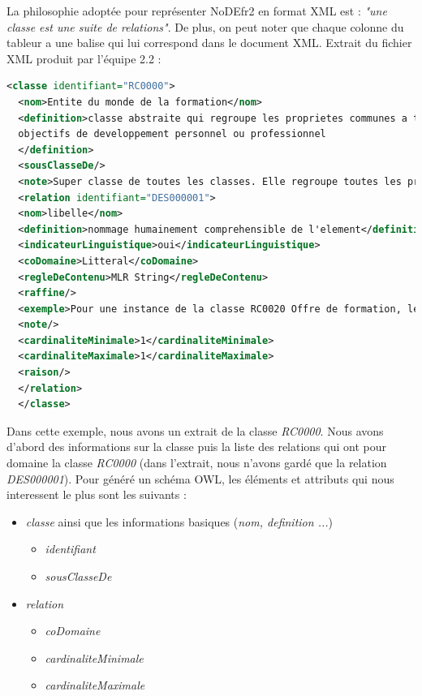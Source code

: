 \documentclass[11pt]{report}
\begin{document}
La philosophie adoptée pour représenter NoDEfr2 en format XML est : \emph{"une classe est une suite de relations"}. De plus, on peut noter que chaque colonne du tableur a une balise qui lui correspond dans le document XML.
\hfill \break
Extrait du fichier XML produit par l'équipe 2.2 :
\begin{lstlisting}[language=XML]
  <classe identifiant="RC0000">
  <nom>Entite du monde de la formation</nom>
  <definition>classe abstraite qui regroupe les proprietes communes a toutes les situations ou a l'ensemble de situations visant un ou plusieurs
  objectifs de developpement personnel ou professionnel
  </definition>
  <sousClasseDe/>
  <note>Super classe de toutes les classes. Elle regroupe toutes les proprietes des classes presentes dans ce modele  </note>
  <relation identifiant="DES000001">
  <nom>libelle</nom>
  <definition>nommage humainement comprehensible de l'element</definition>
  <indicateurLinguistique>oui</indicateurLinguistique>
  <coDomaine>Litteral</coDomaine>
  <regleDeContenu>MLR String</regleDeContenu>
  <raffine/>
  <exemple>Pour une instance de la classe RC0020 Offre de formation, le libelle pourrait etre " BTS services informatiques aux organisations"</exemple>
  <note/>
  <cardinaliteMinimale>1</cardinaliteMinimale>
  <cardinaliteMaximale>1</cardinaliteMaximale>
  <raison/>
  </relation>
  </classe>
\end{lstlisting}
Dans cette exemple, nous avons un extrait de la classe \emph{RC0000}. Nous avons d'abord des informations sur la classe puis la liste des relations qui ont pour domaine la classe \emph{RC0000} (dans l'extrait, nous n'avons gardé que la relation \emph{DES000001}).
\hfill \break
Pour généré un schéma OWL, les éléments et attributs qui nous interessent le plus sont les suivants :
\begin{itemize}
\item \emph{classe} ainsi que les informations basiques (\emph{nom, definition ...})
  \begin{itemize}
  \item \emph{identifiant}
  \item \emph{sousClasseDe}
  \end{itemize}
\item \emph{relation}
  \begin{itemize}
  \item \emph{coDomaine}
  \item \emph{cardinaliteMinimale}
  \item \emph{cardinaliteMaximale}
  \end{itemize}
\end{itemize}
\end{document}
